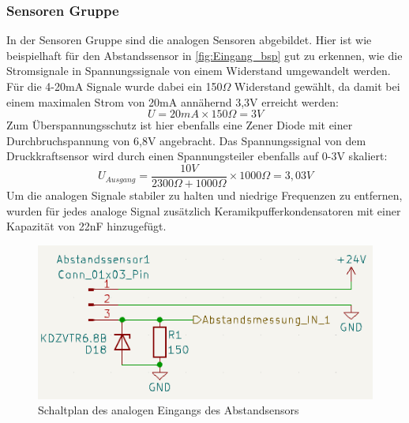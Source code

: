 \subsubsection{Sensoren Gruppe}
In der Sensoren Gruppe sind die analogen Sensoren abgebildet. Hier ist wie beispielhaft für den Abstandssensor in \autoref{fig:Eingang_bsp} gut zu erkennen, wie die Stromsignale in Spannungssignale von einem Widerstand umgewandelt werden. Für die 4-20mA Signale wurde dabei ein 150$\Omega$ Widerstand gewählt, da damit bei einem maximalen Strom von 20mA annähernd 3,3V erreicht werden:
\begin{equation}
	U = 20mA\times150\Omega = 3V
\end{equation}
Zum Überspannungsschutz ist hier ebenfalls eine Zener Diode mit einer Durchbruchspannung von 6,8V angebracht.
Das Spannungssignal von dem Druckkraftsensor wird durch einen Spannungsteiler ebenfalls auf 0-3V skaliert:
\begin{equation}
	U_{Ausgang} = \frac{10V}{2300\Omega + 1000\Omega}\times1000\Omega = 3,03V
\end{equation}
Um die analogen Signale stabiler zu halten und niedrige Frequenzen zu entfernen, wurden für jedes analoge Signal zusätzlich Keramikpufferkondensatoren mit einer Kapazität von 22nF hinzugefügt.
\begin{figure}[H]
	\centering
	\includegraphics[width=1.0\textwidth]{images/Hardware/Analoger_Eingang.PNG}
		\caption{Schaltplan des analogen Eingangs des Abstandsensors}
	\label{fig:Eingang_bsp}
\end{figure}
